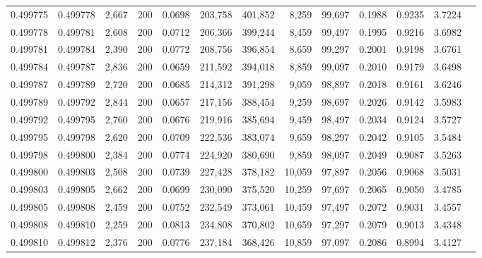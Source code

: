 \begin{tabular}{rrrrrrrrrrrrr}
0.499775 & 0.499778 &  2,667 & 200 &                                     0.0698 & 203,758 & 401,852 &   8,259 &  99,697 & 0.1988 & 0.9235 & 3.7224 \\
0.499778 & 0.499781 &  2,608 & 200 &                                     0.0712 & 206,366 & 399,244 &   8,459 &  99,497 & 0.1995 & 0.9216 & 3.6982 \\
0.499781 & 0.499784 &  2,390 & 200 &                                     0.0772 & 208,756 & 396,854 &   8,659 &  99,297 & 0.2001 & 0.9198 & 3.6761 \\
0.499784 & 0.499787 &  2,836 & 200 &                                     0.0659 & 211,592 & 394,018 &   8,859 &  99,097 & 0.2010 & 0.9179 & 3.6498 \\
0.499787 & 0.499789 &  2,720 & 200 &                                     0.0685 & 214,312 & 391,298 &   9,059 &  98,897 & 0.2018 & 0.9161 & 3.6246 \\
0.499789 & 0.499792 &  2,844 & 200 &                                     0.0657 & 217,156 & 388,454 &   9,259 &  98,697 & 0.2026 & 0.9142 & 3.5983 \\
0.499792 & 0.499795 &  2,760 & 200 &                                     0.0676 & 219,916 & 385,694 &   9,459 &  98,497 & 0.2034 & 0.9124 & 3.5727 \\
0.499795 & 0.499798 &  2,620 & 200 &                                     0.0709 & 222,536 & 383,074 &   9,659 &  98,297 & 0.2042 & 0.9105 & 3.5484 \\
0.499798 & 0.499800 &  2,384 & 200 &                                     0.0774 & 224,920 & 380,690 &   9,859 &  98,097 & 0.2049 & 0.9087 & 3.5263 \\
0.499800 & 0.499803 &  2,508 & 200 &                                     0.0739 & 227,428 & 378,182 &  10,059 &  97,897 & 0.2056 & 0.9068 & 3.5031 \\
0.499803 & 0.499805 &  2,662 & 200 &                                     0.0699 & 230,090 & 375,520 &  10,259 &  97,697 & 0.2065 & 0.9050 & 3.4785 \\
0.499805 & 0.499808 &  2,459 & 200 &                                     0.0752 & 232,549 & 373,061 &  10,459 &  97,497 & 0.2072 & 0.9031 & 3.4557 \\
0.499808 & 0.499810 &  2,259 & 200 &                                     0.0813 & 234,808 & 370,802 &  10,659 &  97,297 & 0.2079 & 0.9013 & 3.4348 \\
0.499810 & 0.499812 &  2,376 & 200 &                                     0.0776 & 237,184 & 368,426 &  10,859 &  97,097 & 0.2086 & 0.8994 & 3.4127 \\

\end{tabular}
